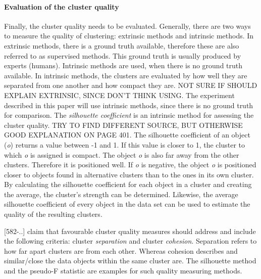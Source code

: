   \paragraph{Evaluation of the cluster quality}
  Finally, the cluster quality needs to be evaluated. Generally, there are two ways to measure the quality of clustering: extrinsic methods and intrinsic methods. In extrinsic methods, there is a ground truth available, therefore these are also referred to as supervised methods. This ground truth is usually produced by experts (humans). Intrinsic methods are used, when there is no ground truth available. In intrinsic methods, the clusters are evaluated by how well they are separated from one another and how compact they are.
  NOT SURE IF SHOULD EXPLAIN EXTRINSIC, SINCE DON'T THINK USING.
  The experiment described in this paper will use intrinsic methods, since there is no ground truth for comparison. The \textit{silhouette coefficient} is an intrinsic method for assessing the cluster quality. TRY TO FIND DIFFERENT SOURCE, BUT OTHERWISE GOOD EXPLANATION ON PAGE 401.
  The silhouette coefficient of an object (\textit{o})  returns a value between -1 and 1. If this value is closer to 1, the cluster to which \textit{o} is assigned is compact. The object \textit{o} is also far away from the other clusters. Therefore it is positioned well. If \textit{o} is negative, the object \textit{o} is positioned closer to objects found in alternative clusters than to the ones in its own cluster.
  By calculating the silhouette coefficient for each object in a cluster and creating the average, the cluster's strength can be determined. Likewise, the average silhouette coefficient of every object in the data set can be used to estimate the quality of the resulting clusters.


  \textcite{DataMiningAndPredictiveAnalytics}[582-..] claim that favourable cluster quality measures should address and include the following criteria: cluster \textit{separation} and cluster \textit{cohesion}. Separation refers to how far apart clusters are from each other. Whereas cohesion describes and similar/close the data objects within the same cluster are. The silhouette method and the pseudo-F statistic are examples for such quality measuring methods.

